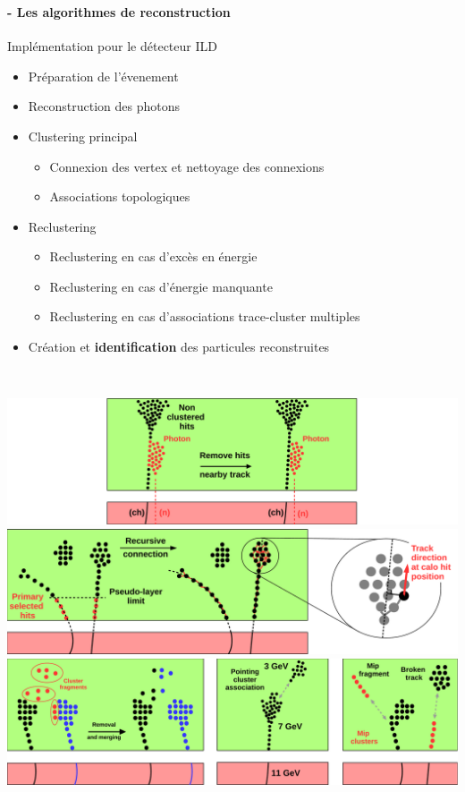\documentclass[8pt]{beamer}
\begin{document}
  \begin{frame}
  \frametitle{\secname}
  \framesubtitle{\subsecname - Les algorithmes de reconstruction}
    \begin{block}{Implémentation pour le détecteur ILD}
      \begin{itemize}
        \item<1-> Préparation de l'évenement
        \item<2-> Reconstruction des photons
        \item<3-> Clustering principal
        \begin{itemize}
          \item<3-> Connexion des vertex et nettoyage des connexions
          \item<4-> Associations topologiques
        \end{itemize}
        \item<5-> Reclustering
        \begin{itemize}
          \item<5-> Reclustering en cas d'excès en énergie
          \item<5-> Reclustering en cas d'énergie manquante
          \item<5-> Reclustering en cas d'associations trace-cluster multiples
        \end{itemize}
        \item<6-> Création et \textbf{identification} des particules reconstruites
      \end{itemize}
    \end{block}
    ~ \\
    \begin{overprint}
       \centering \includegraphics[width=0.8\linewidth]{NearbyTrackPhotonRemovalILD.pdf}
       \centering \includegraphics[width=0.8\linewidth]{TrackDrivenSeeding.pdf}
       \centering \includegraphics[width=0.8\linewidth]{ILDTopologicalAssociations.pdf}

\end{overprint}
\end{frame}
\end{document}
